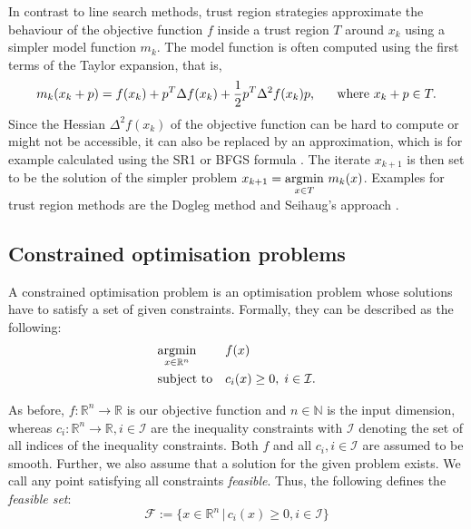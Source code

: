 \indent In contrast to line search methods, trust region strategies approximate the behaviour of the objective function $f$ inside a trust region $T$ around $x_k$ using a simpler model function $m_k$. The model function is often computed using the first terms of the Taylor expansion, that is, \[m_k(x_k + p) = f(x_k) + p^T\Delta f(x_k) + \frac{1}{2}p^T\Delta^2 f(x_k) p \text{, \indent where } x_k + p \in T.\] Since the Hessian $\Delta^2 f(x_k)$ of the objective function can be hard to compute or might not be accessible, it can also be replaced by an approximation, which is for example calculated using the SR1 or BFGS formula \cite{NoceWrig06}. The iterate $x_{k+1}$ is then set to be the solution of the simpler problem $x_{k+1} = \underset{x \in T}{\operatorname*{argmin} }  \,\,m_k(x)$. Examples for trust region methods are the Dogleg method and Seihaug's approach \cite{NoceWrig06}.

\subsection{Constrained optimisation problems}
\label{ssec:copt_prob}
A constrained optimisation problem is an optimisation problem whose solutions have to satisfy a set of given constraints. Formally, they can be described as the following:\\
\begin{equation}
	\label{constrained_min_problem}
	\begin{aligned}
		& \underset{x \in \mathbb{R}^n}{\operatorname*{argmin}}
		& & f(x) \\
		& \text{subject to}
		& & c_i(x) \geq 0, \; i \in \mathcal{I}.
	\end{aligned}
\end{equation}

As before, $f\colon \mathbb{R}^n\to \mathbb{R}$ is our objective function and $n \in \mathbb{N}$ is the input dimension, whereas $c_i\colon \mathbb{R}^n\to \mathbb{R}, i \in \mathcal{I}$ are the inequality constraints with $\mathcal{I}$ denoting the set of all indices of the inequality constraints. Both $f$ and all $c_i, i \in \mathcal{I}$ are assumed to be smooth. Further, we also assume that a solution for the given problem exists. We call any point satisfying all constraints \textit{feasible}. Thus, the following defines the \textit{feasible set}:
\[ \mathcal{F} := \{x \in \mathbb{R}^n \,|\, c_i(x) \geq 0, i\in \mathcal{I} \} \]

